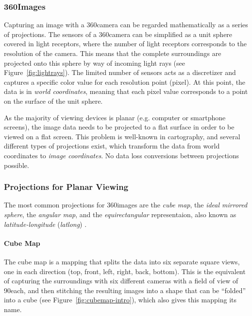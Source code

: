 \subsubsection{360\degree Images}\label{subsec:fundamentals_360}
Capturing an image with a 360\degree camera can be regarded mathematically as a series of projections. The sensors of a 360\degree camera can be simplified as a unit sphere covered in light receptors, where the number of light receptors corresponds to the resolution of the camera. This means that the complete surroundings are projected onto this sphere by way of incoming light rays (see Figure~\ref{fig:lightrays}). The limited number of sensors acts as a discretizer and captures a specific color value for each resolution point (pixel). At this point, the data is in \emph{world coordinates}, meaning that each pixel value corresponds to a point on the surface of the unit sphere. 

As the majority of viewing devices is planar (e.g. computer or smartphone screens), the image data needs to be projected to a flat surface in order to be viewed on a flat screen. This problem is well-known in cartography, and several different types of projections exist, which transform the data from world coordinates to \emph{image coordinates}. No data loss \ar conversions between projections possible.

\subsubsection{Projections for Planar Viewing \label{subsec:projections} \cite{hdrbook}}
The most common projections for 360\degree images are the \emph{cube map}, the \emph{ideal mirrored sphere}, the \emph{angular map},  and the \emph{equirectangular} representaion, also known as \emph{latitude-longitude} (\emph{latlong}) \cite{hdrbook}.

\paragraph{Cube Map}
The cube map is a mapping that splits the data into six separate square views, one in each direction (top, front, left, right, back, bottom). This is the equivalent of capturing the surroundings with six different cameras with a field of view of 90\degree each, and then stitching the resulting images into a shape that can be ``folded'' into a cube (see Figure~\ref{fig:cubemap-intro}), which also gives this mapping its name.


